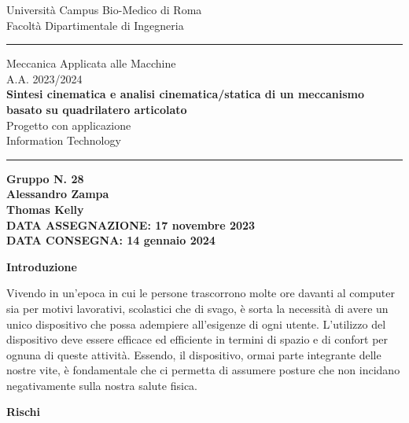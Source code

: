 \documentclass{article}
\begin{document}
Università Campus Bio-Medico di Roma \\
Facoltà Dipartimentale di Ingegneria

\vspace{20pt}

\rule{\linewidth}{2pt}

\begin{center}
    Meccanica Applicata alle Macchine \\
    A.A. 2023/2024 \\
    \vspace{15pt}
    {\bfseries\fontsize{14}{16}\selectfont
    Sintesi cinematica e analisi
    cinematica/statica di un meccanismo
    basato su quadrilatero articolato
    }
    \mdseries
    \\
    \vspace{15pt}
    Progetto con applicazione \\
    Information Technology
\end{center}

\rule{\linewidth}{2pt}

\begin{center}
    \bfseries
    Gruppo N. 28
    \mdseries
    \vspace{10pt}
    \\
    Alessandro Zampa \\
    Thomas Kelly \\
    \vspace{15pt}
    DATA ASSEGNAZIONE: 17 novembre 2023 \\
    DATA CONSEGNA: 14 gennaio 2024
\end{center}

\clearpage
\tableofcontents %
\listoftables
\listoffigures %
\clearpage

\begin{center}
    \bfseries
    Introduzione
    \mdseries
\end{center}
Vivendo in un’epoca in cui le persone trascorrono molte ore davanti al computer sia per motivi lavorativi, scolastici che di svago, è sorta la necessità di avere un unico dispositivo che possa adempiere all’esigenze di ogni utente. L’utilizzo del dispositivo deve essere efficace ed efficiente in termini di spazio e di confort per ognuna di queste attività. Essendo, il dispositivo, ormai parte integrante delle nostre vite, è fondamentale che ci permetta di assumere posture che non incidano negativamente sulla nostra salute fisica.

\bfseries
    Rischi
\mdseries
\end{document}
